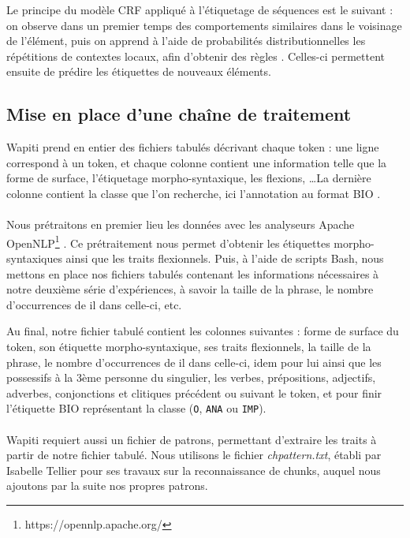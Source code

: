 \documentclass[a4paper,12pt]{article}
\begin{document}
Le principe du modèle CRF appliqué à l'étiquetage de séquences est le suivant : on observe dans un premier temps des comportements similaires dans le voisinage de l'élément, puis on apprend à l'aide de probabilités distributionnelles les répétitions de contextes locaux, afin d'obtenir des \og règles \fg{}. Celles-ci permettent ensuite de prédire les étiquettes de nouveaux éléments.


\subsection{Mise en place d'une chaîne de traitement}

Wapiti prend en entier des fichiers tabulés décrivant chaque token : une ligne correspond à un token, et chaque colonne contient une information telle que la forme de surface, l'étiquetage morpho-syntaxique, les flexions, \ldots La dernière colonne contient la classe que l'on recherche, ici l'annotation au format BIO .

\paragraph{}
Nous prétraitons en premier lieu les données avec les analyseurs Apache OpenNLP\footnote{https://opennlp.apache.org/} \citep{boudin-detection-taln12}. 
Ce prétraitement nous permet d'obtenir les étiquettes morpho-syntaxiques ainsi que les traits flexionnels.
Puis, à l'aide de scripts Bash, nous mettons en place nos fichiers tabulés contenant les informations nécessaires à notre deuxième série d'expériences, à savoir la taille de la phrase, le nombre d'occurrences de \og il \fg{} dans celle-ci, etc.

Au final, notre fichier tabulé contient les colonnes suivantes : forme de surface du token, son étiquette morpho-syntaxique, ses traits flexionnels, la taille de la phrase, le nombre d'occurrences de \og il \fg{} dans celle-ci, idem pour \og lui \fg{} ainsi que les possessifs à la 3ème personne du singulier, les verbes, prépositions, adjectifs, adverbes, conjonctions et clitiques précédent ou suivant le token, et pour finir l'étiquette BIO représentant la classe (\verb!O!, \verb!ANA! ou \verb!IMP!).

\paragraph{}
Wapiti requiert aussi un fichier de patrons, permettant d'extraire les traits à partir de notre fichier tabulé. Nous utilisons le fichier \emph{chpattern.txt}, établi par Isabelle Tellier pour ses travaux sur la reconnaissance de chunks, auquel nous ajoutons par la suite nos propres patrons.
\end{document}
